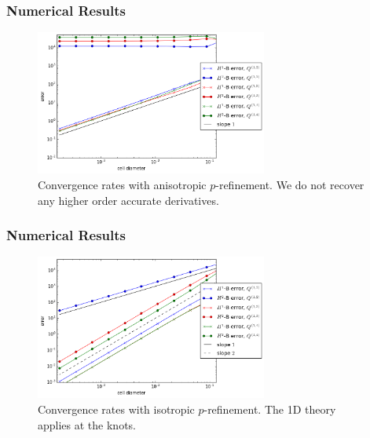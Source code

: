 \documentclass[8pt]{beamer}
\begin{document}
\begin{frame}
    \frametitle{Numerical Results}
    \begin{figure}
        \centering
        \includegraphics[width=3in]{Pictures/periodic-dont-eliminate-nonnormal-convergence.png}

        \caption{Convergence rates with anisotropic \(p\)-refinement. We do not
        recover any higher order accurate derivatives.}
    \end{figure}
\end{frame}

\begin{frame}
    \frametitle{Numerical Results}
    \begin{figure}
        \centering

        \includegraphics[width=3in]{Pictures/periodic-nonnormal-convergence.png}

        \caption{Convergence rates with isotropic \(p\)-refinement. The 1D
        theory applies at the knots.}
    \end{figure}
\end{frame}
\end{document}
